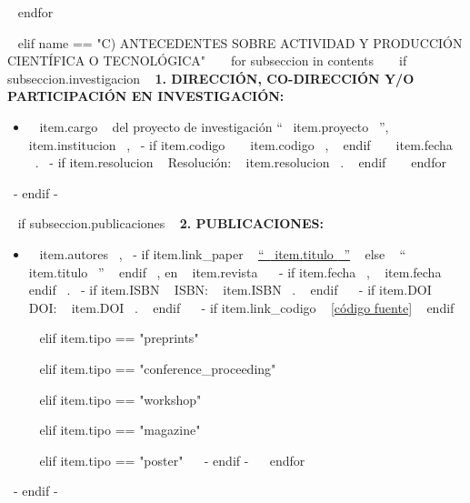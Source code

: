   ~{ endfor }~
  \espacioEntreSecciones{}


~{ elif name == "C) ANTECEDENTES SOBRE ACTIVIDAD Y PRODUCCIÓN CIENTÍFICA O TECNOLÓGICA" }~
  ~{ for subseccion in contents }~
    ~{ if subseccion.investigacion }~
      \textbf{1. DIRECCIÓN, CO-DIRECCIÓN Y/O PARTICIPACIÓN EN INVESTIGACIÓN:}
      \begin{itemize}
      ~{ for item in subseccion.investigacion }~
        \item ~{{ item.cargo }}~ del proyecto de investigación ``~{{ item.proyecto }}~'', ~{{ item.institucion }}~,
              ~{- if item.codigo }~ ~{{ item.codigo }}~, ~{ endif }~
              ~{{ item.fecha }}~.
              ~{- if item.resolucion }~ Resolución: ~{{ item.resolucion }}~. ~{ endif }~
        \espacioEntreItems{}
      ~{ endfor }~
      \end{itemize}
      \espacioEntreSubSecciones{}
    ~{- endif -}~

    ~{ if subseccion.publicaciones }~
      \textbf{2. PUBLICACIONES:}
      \begin{itemize}
      ~{ for item in subseccion.publicaciones }~
        ~{ if item.tipo == "articulo" }~
          \item ~{{ item.autores }}~, ~{- if item.link_paper }~ \href{~{{ item.link_paper }}~}{``~{{ item.titulo }}~''} ~{ else }~ ``~{{ item.titulo }}~'' ~{ endif }~, en ~{{ item.revista }}~ ~{- if item.fecha }~, ~{{ item.fecha }}~ ~{ endif }~.
                ~{- if item.ISBN }~ ISBN: ~{{ item.ISBN }}~. ~{ endif }~
                ~{- if item.DOI }~ DOI: ~{{ item.DOI }}~. ~{ endif }~
                ~{- if item.link_codigo }~ \href{~{{ item.link_codigo }}~}{[código fuente]} ~{ endif }~
          \espacioEntreItems{}

        ~{ elif item.tipo == "preprints" }~

        ~{ elif item.tipo == "conference_proceeding" }~

        ~{ elif item.tipo == "workshop" }~

        ~{ elif item.tipo == "magazine" }~

        ~{ elif item.tipo == "poster" }~
        ~{- endif -}~
      ~{ endfor }~
      \end{itemize}
      \espacioEntreSubSecciones{}
    ~{- endif -}~

